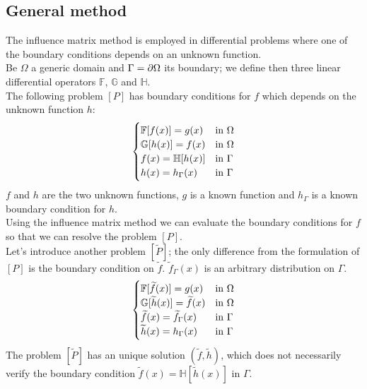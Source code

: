 \subsection{General method}
The influence matrix method is employed in differential problems where one of the boundary conditions depends on an unknown function.\\
Be $\Omega$ a generic domain and $\Gamma=\partial\Omega$ its boundary; we define then three linear differential operators $\mathbb{F}$, $\mathbb{G}$ and $\mathbb{H}$.\\
The following problem $[P]$ has boundary conditions for $f$ which depends on the unknown function $h$:
\begin{equation}
[P]
\begin{cases}
\mathbb{F}[f(x)]=g(x) & \textnormal{in }\Omega\\
\mathbb{G}[h(x)]=f(x) & \textnormal{in }\Omega\\
f(x)=\mathbb{H}[h(x)] & \textnormal{in }\Gamma\\
h(x)=h_\Gamma(x) & \textnormal{in }\Gamma\\
\end{cases}
\end{equation}
$f$ and $h$ are the two unknown functions, $g$ is a known function and $h_\Gamma$ is a known boundary condition for $h$.\\
Using the influence matrix method we can evaluate the boundary conditions for $f$ so that we can resolve the problem $[P]$.\\
Let's introduce another problem $[\widetilde{P}]$; the only difference from the formulation of $[P]$ is the boundary condition on $\widetilde{f}$. $\widetilde{f}_\Gamma(x)$ is an arbitrary distribution on $\Gamma$.
\begin{equation}
[\widetilde{P}]
\begin{cases}
\mathbb{F}[\widetilde{f}(x)]=g(x) & \textnormal{in }\Omega\\
\mathbb{G}[\widetilde{h}(x)]=\widetilde{f}(x) & \textnormal{in }\Omega\\
\widetilde{f}(x)=\widetilde{f}_\Gamma(x) & \textnormal{in }\Gamma\\
\widetilde{h}(x)=h_\Gamma(x) & \textnormal{in }\Gamma\\
\end{cases}
\end{equation}
The problem $[\widetilde{P}]$ has an unique solution $(\widetilde{f},\widetilde{h})$, which does not necessarily verify the boundary condition $\widetilde{f}(x)=\mathbb{H}[\widetilde{h}(x)]$ in $\Gamma$.\\
